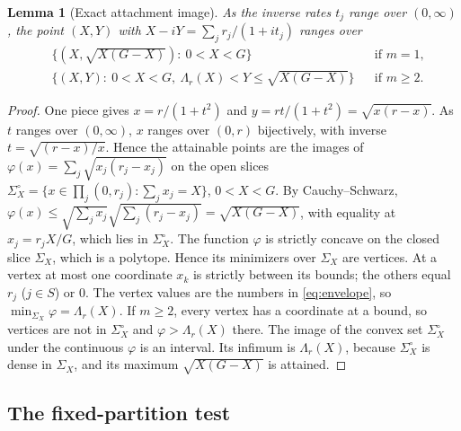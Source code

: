 \documentclass[11pt,a4paper]{article}
\theoremstyle{plain}
\newtheorem{lemma}[theorem]{Lemma}
\theoremstyle{definition}
\theoremstyle{remark}
\newcommand{\Env}{\Lambda}
\begin{document}
\begin{lemma}[Exact attachment image]\label{lem:image}
As the inverse rates $t_j$ range over $(0,\infty)$, the point
$(X,Y)$ with $X-iY=\sum_jr_j/(1+it_j)$ ranges over
\begin{align*}
 &\{(X,\sqrt{X(G-X)}):\ 0<X<G\}&&\text{if }m=1,\\
 &\{(X,Y):\ 0<X<G,\ \Env_r(X)<Y\le\sqrt{X(G-X)}\}&&\text{if }m\ge2.
\end{align*}
\end{lemma}
\begin{proof}
One piece gives $x=r/(1+t^2)$ and $y=rt/(1+t^2)=\sqrt{x(r-x)}$. As $t$ ranges
over $(0,\infty)$, $x$ ranges over $(0,r)$ bijectively, with inverse
$t=\sqrt{(r-x)/x}$. Hence the attainable points are the images of
$\varphi(x)=\sum_j\sqrt{x_j(r_j-x_j)}$ on the open slices
$\Sigma_X^\circ=\{x\in\prod_j(0,r_j):\sum_jx_j=X\}$, $0<X<G$. By
Cauchy--Schwarz, $\varphi(x)\le\sqrt{\sum_jx_j}\sqrt{\sum_j(r_j-x_j)}
=\sqrt{X(G-X)}$, with equality at $x_j=r_jX/G$, which lies in
$\Sigma_X^\circ$. The function $\varphi$ is strictly concave on the closed
slice $\Sigma_X$, which is a polytope. Hence its minimizers over $\Sigma_X$ are
vertices. At a vertex at most one coordinate $x_k$ is strictly between its
bounds; the others equal $r_j$ ($j\in S$) or $0$. The vertex values are the
numbers in \eqref{eq:envelope}, so $\min_{\Sigma_X}\varphi=\Env_r(X)$. If
$m\ge2$, every vertex has a coordinate at a bound, so vertices are not in
$\Sigma_X^\circ$ and $\varphi>\Env_r(X)$ there. The image of the convex set
$\Sigma_X^\circ$ under the continuous $\varphi$ is an interval. Its infimum is
$\Env_r(X)$, because $\Sigma_X^\circ$ is dense in $\Sigma_X$, and its maximum
$\sqrt{X(G-X)}$ is attained.
\end{proof}

\subsection{The fixed-partition test}
\end{document}
